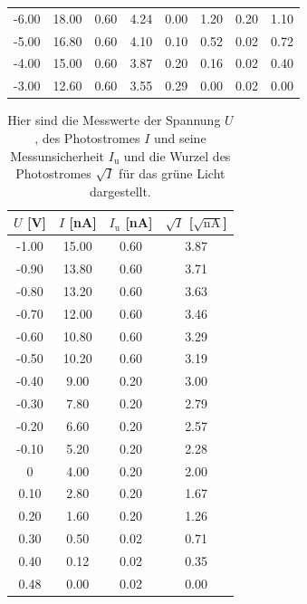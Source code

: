 \documentclass[titlepage = firstcover]{scrartcl}
\begin{document}
\begin{table}[h]
\begin{tabular}{c c c c c c c c}
             -6.00   &   18.00   &   0.60   &   4.24   &   0.00   &    1.20   &   0.20   &   1.10 \\
             -5.00   &   16.80   &   0.60   &   4.10   &   0.10   &    0.52   &   0.02   &   0.72 \\
             -4.00   &   15.00   &   0.60   &   3.87   &   0.20   &    0.16   &   0.02   &   0.40 \\
             -3.00   &   12.60   &   0.60   &   3.55   &   0.29   &    0.00   &   0.02   &   0.00 \\
              \bottomrule
          \end{tabular}
        \end{table}

        \FloatBarrier
  
    \begin{table}[h]
      \centering
      \caption{Hier sind die Messwerte der Spannung $U$, des Photostromes $I$ und seine Messunsicherheit $I_{\text{u}}$ und die Wurzel des Photostromes $\sqrt{I}$ für das grüne Licht dargestellt.}
      \label{tab:gruenesLicht}
      \begin{tabular}{c c c c}
        \toprule
        {$U$ [V]} & {$I$ [nA]} & {$I_{\text{u}}$ [nA]} & {$\sqrt{I}$ [$\sqrt{\text{nA}}$]} \\
        \midrule
        -1.00   &   15.00   &   0.60   &   3.87 \\
        -0.90   &   13.80   &   0.60   &   3.71 \\
        -0.80   &   13.20   &   0.60   &   3.63 \\
        -0.70   &   12.00   &   0.60   &   3.46 \\
        -0.60   &   10.80   &   0.60   &   3.29 \\
        -0.50   &   10.20   &   0.60   &   3.19 \\
        -0.40   &    9.00   &   0.20   &   3.00 \\
        -0.30   &    7.80   &   0.20   &   2.79 \\
        -0.20   &    6.60   &   0.20   &   2.57 \\
        -0.10   &    5.20   &   0.20   &   2.28 \\
         0      &    4.00   &   0.20   &   2.00 \\
         0.10   &    2.80   &   0.20   &   1.67 \\
         0.20   &    1.60   &   0.20   &   1.26 \\
         0.30   &    0.50   &   0.02   &   0.71 \\
         0.40   &    0.12   &   0.02   &   0.35 \\
         0.48   &    0.00   &   0.02   &   0.00 \\
        \bottomrule
      \end{tabular}
    \end{table}
\end{document}
